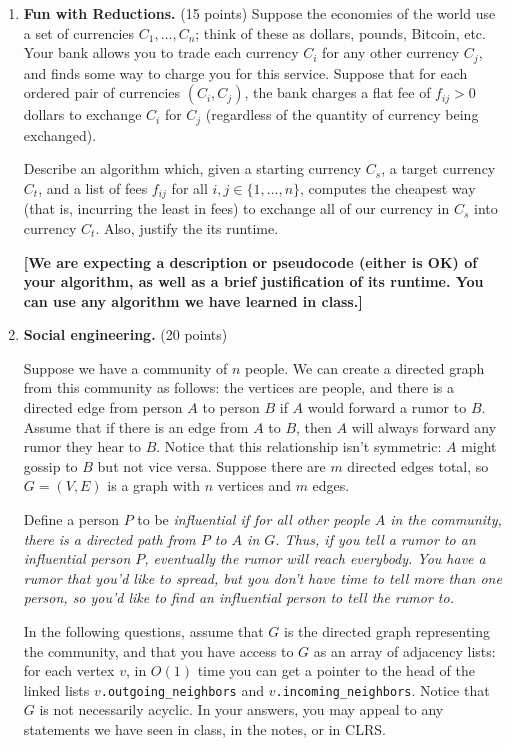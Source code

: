\documentclass[12pt]{article}
\begin{document}
\begin{enumerate}


  \item \textbf{Fun with Reductions.}
(15 points) Suppose the  economies of the world use a set of currencies $C_1,\ldots,C_n$; think of these as dollars, pounds, Bitcoin, etc. Your bank allows you to trade each currency $C_i$ for any other currency $C_j$, and finds some way to charge you for this service. Suppose that for each ordered pair of currencies $(C_i,C_j)$, the bank charges a flat fee of $f_{ij} > 0$ dollars to exchange $C_i$ for $C_j$ (regardless of the quantity of currency being exchanged).

      Describe an algorithm which, given a starting currency $C_s$, a target currency $C_t$, and a list of fees $f_{ij}$ for all $i,j \in \{1,\ldots,n\}$, computes the cheapest way (that is, incurring the least in fees) to exchange all of our currency in $C_s$ into currency $C_t$.  Also, justify the its runtime.

      \textbf{[We are expecting a description or pseudocode (either is OK) of your algorithm, as well as a brief justification of its runtime. You can use any algorithm we have learned in class.]}


  \item \textbf{Social engineering.} (20 points)

  Suppose we have a community of $n$ people.  We can create a directed graph from this community as follows: the vertices are people, and there is a directed edge from person $A$ to person $B$ if $A$ would forward a rumor to $B$. Assume that if there is an edge from $A$ to $B$, then $A$ will always forward any rumor they hear to $B$. Notice that this relationship isn't symmetric: $A$ might gossip to $B$ but not
vice versa. Suppose there are $m$ directed edges total, so $G = (V,E)$ is a graph with $n$ vertices and $m$ edges.

  Define a person $P$ to be \em influential \em if for all other people $A$ in the community, there is a directed path from $P$ to $A$ in $G$.  Thus, if you tell a rumor to an influential person $P$, eventually the rumor will reach everybody. You have a rumor that you'd like to spread, but you don't have time to tell more than one person, so you'd like to find an influential person to tell the rumor to.
  
  In the following questions, assume that $G$ is the directed graph representing the community, and that you have access to $G$ as an array of adjacency lists: for each vertex $v$, in $O(1)$ time you can get a pointer to the head of the linked lists $v$\texttt{.outgoing\_neighbors} and $v$\texttt{.incoming\_neighbors}.  Notice that $G$ is not necessarily acyclic. In your answers, you may appeal to any statements we have seen in class, in the notes, or in CLRS.
  

\end{enumerate}
\end{document}
